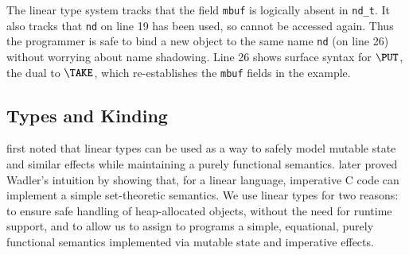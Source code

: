 \documentclass[9pt\ifFinal\else,preprint,nocopyrightspace\fi,\ifAlpha\else natbib,authoryear\fi]{sigplanconf}
\newcommand{\code}[1]{\texttt{#1}}
\begin{document}
The linear type system tracks that the field \code{mbuf} is logically absent
in \code{nd\_t}. It also tracks that \code{nd} on line 19 has been used,
so cannot be accessed again. Thus the programmer is safe to bind a new object
to the same name \code{nd} (on line 26) without worrying about name
shadowing. Line 26 shows surface syntax for $\PUT$, the dual to $\TAKE$,
which re-establishes the \code{mbuf} fields in the example.














\subsection{Types and Kinding}\label{s:kinding}

\citet{Wadler_90} first noted that linear types can be used as a way to safely
model mutable state and similar effects while maintaining a purely functional
semantics.  \citet{Hofmann_00} later proved Wadler's intuition by
showing that, for a linear language, imperative C code can implement a simple
set-theoretic semantics. We use linear types for two reasons: to ensure safe handling of heap-allocated objects, without the need for runtime 
support, and to allow us to assign to \CDSL programs a simple, equational, purely functional semantics implemented via mutable state and imperative effects.
\end{document}

